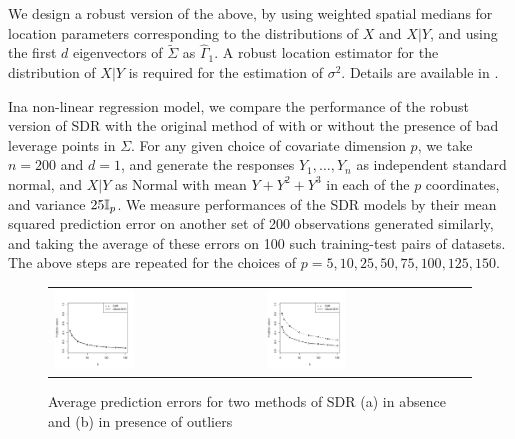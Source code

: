 We design a robust version of the above, by using weighted spatial medians for location 
parameters corresponding to the distributions of $X$ and $X | Y$, and using the first $d$ 
eigenvectors of $\tilde{\Sigma}$ as $\hat\Gamma_{1}$. A robust location estimator for 
the distribution of $X | Y$ is required for the estimation of $\sigma^2$. 
Details are available in \cite{ref:PhilTransRoyalSoc094385_AdragniCook}.

Ina non-linear regression model, we compare the performance of the robust version of 
SDR with the original method of 
\cite{ref:PhilTransRoyalSoc094385_AdragniCook} 
with or without the presence of bad leverage points in $\Sigma$. 
For any given choice of covariate dimension $p$, we take $n=200$ and $d=1$, 
and generate the responses 
$Y_1, \ldots, Y_n$ as independent standard normal, and 
$X | Y$ as Normal with mean $Y + Y^{2} + Y^3$ in each of the $p$ coordinates, 
and variance $25 {\mathbb{I}}_p$.
We measure performances of the SDR models by their mean squared prediction error on 
another set of 200 observations  generated similarly, and taking the average of these 
errors on 100 such training-test pairs of datasets. The above steps 
are repeated for the choices of $p = 5, 10, 25, 50, 75, 100, 125, 150$.

\begin{figure}[t]
\begin{center}
\begin{tabular}{ll}
\includegraphics[width=0.4\textwidth]{./Plots/SDRcomparison_noout} &
\includegraphics[width=0.4\textwidth]{./Plots/SDRcomparison_out}
\end{tabular}
\caption{Average prediction errors for two methods of SDR (a) in absence and (b) in presence of outliers}
\label{fig:SDRfig}
\end{center}
\end{figure}

